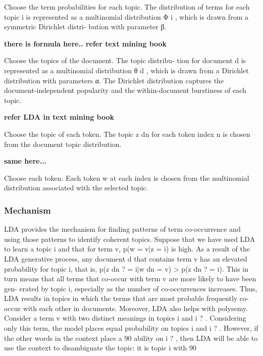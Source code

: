 Choose the term probabilities for each topic. The distribution of terms for each topic i is represented as a multinomial
distribution Φ i , which is drawn from a symmetric Dirichlet distri-
bution with parameter β.

\textbf{there is formula here.. refer text mining book}

Choose the topics of the document. The topic distribu-
tion for document d is represented as a multinomial distribution
θ d , which is drawn from a Dirichlet distribution with parameters
α. The Dirichlet distribution captures the document-independent
popularity and the within-document burstiness of each topic.

\textbf{refer LDA in text mining book}

Choose the topic of each token. The topic z dn for each
token index n is chosen from the document topic distribution.

\textbf{same here...}

Choose each token. Each token w at each index is chosen from
the multinomial distribution associated with the selected topic.



\subsubsection{Mechanism} LDA provides the mechanism for finding patterns of
term co-occurrence and using those patterns to identify coherent topics.
Suppose that we have used LDA to learn a topic i and that for term v,
p(w = v|z = i) is high. As a result of the LDA generative process, any
document d that contains term v has an elevated probability for topic
i, that is, p(z dn ? = i|w dn = v) > p(z dn ? = i). This in turn means that
all terms that co-occur with term v are more likely to have been gen-
erated by topic i, especially as the number of co-occurrences increases.
Thus, LDA results in topics in which the terms that are most probable
frequently co-occur with each other in documents.
Moreover, LDA also helps with polysemy. Consider a term v with
two distinct meanings in topics i and i ? . Considering only this term, the
model places equal probability on topics i and i ? . However, if the other
words in the context place a 90%
ability on i ? , then LDA will be able to use the context to disambiguate
the topic: it is topic i with 90%

